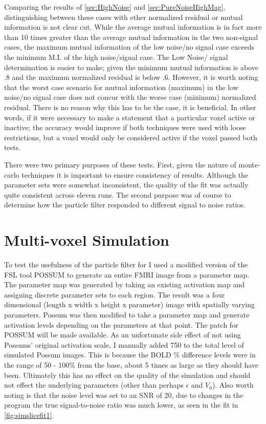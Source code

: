 Comparing the results of \autoref{sec:HighNoise} and \autoref{sec:PureNoiseHighMag}, 
distinguishing between these cases with ether normalized residual or mutual information
is not clear cut. While the average mutual information is in fact more than 10 times
greater than the average mutual information in the two non-signal cases, the maximum
mutual information of the low noise/no signal case exceeds the minimum M.I. of the high noise/signal
case. The Low Noise/ signal determination is easier to make; given
the minimum mutual information is above $.8$ and the maximum normalized residual is below $.6$.
However, it is worth noting that the worst case scenario  for mutual information (maximum) in the
low noise/no signal case does not concur with the worse case (minimum) normalized residual. 
There is no reason why this has to be the case, it is beneficial. In
other words, if it were necessary to make a statement that
a particular voxel active or inactive; the accuracy would improve if both techniques
were used with loose restrictions, but a voxel would only be considered active if the
voxel passed both tests. 

There were two primary purposes of these tests. First, given the nature of monte-carlo
techniques it is important to ensure consistency of results. Although the parameter
sets were somewhat inconsistent, the quality of the fit was actually quite consistent
across eleven runs. The second purpose was of course to determine how the particle 
filter responded to different signal to noise ratios. 

\section{Multi-voxel Simulation}
\label{sec:Multi-voxel Simulation}
To test the usefulness of the particle filter for I used a modified version of the FSL tool 
POSSUM to generate an entire FMRI image from a parameter map. The parameter map was generated
by taking an existing activation map and assigning discrete parameter sets to each region.
The result was a four dimensional (length x width
x height x parameter) image with spatially varying parameters. Possum was then modified
to take a parameter map and generate activation levels depending on the parameters at that
point. The patch for POSSUM will be made available. As an unfortunate side effect of 
not using Possums' original activation scale, I manually added 750 to the total level of
simulated Possum images. This is because the BOLD \% difference levels were in the range
of 50 - 100\% from the base, about 5 times as large as they should have been. Ultimately
this has no effect on the quality of the simulation and should not effect the 
underlying parameters (other than perhaps $\epsilon$ and $V_0$). 
Also worth noting is that the noise level was set to an SNR of 20, due to changes in the 
program the true signal-to-noise ratio was much lower, as seen in the fit in \autoref{fig:simslicefit1}.

